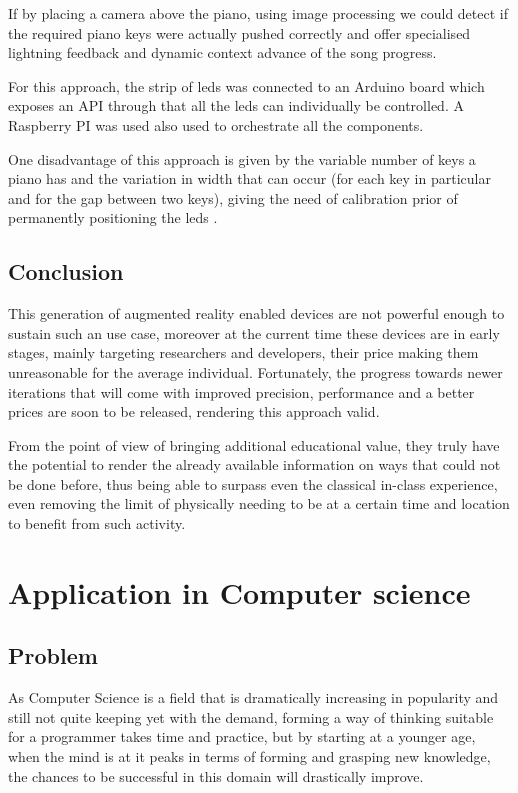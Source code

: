 \documentclass[12 pct]{report}
\begin{document}
If by placing a camera above the piano, using image processing we could detect if the required piano keys were actually pushed correctly and offer specialised lightning feedback and dynamic context advance of the song progress.

For this approach, the strip of leds was connected to an Arduino board which exposes an API through that all the leds can individually be controlled. A Raspberry PI was used also used to orchestrate all the components.

One disadvantage of this approach is given by the variable number of keys a piano has and the variation in width that can occur (for each key in particular and for the gap between two keys), giving the need of calibration prior of permanently positioning the leds .

\section{Conclusion}
This generation of augmented reality enabled devices are not powerful enough to sustain such an use case, moreover at the current time these devices are in early stages, mainly targeting researchers and developers, their price making them unreasonable for the average individual. Fortunately, the progress towards newer iterations that will come with improved precision, performance and a better prices are soon to be released, rendering this approach valid.

From the point of view of bringing additional educational value, they truly have the potential to render the already available information on ways that could not be done before, thus being able to surpass even the classical in-class experience, even removing the limit of physically needing to be at a certain  time and location to benefit from such activity.

\chapter{Application in Computer science}

\section{Problem}
As Computer Science is a field that is dramatically increasing in popularity and still not quite keeping yet with the demand, forming a way of thinking suitable for a programmer takes time and practice, but by starting at a younger age, when the mind is at it peaks in terms of forming and grasping new knowledge, the chances to be successful in this domain will drastically improve.
\end{document}
